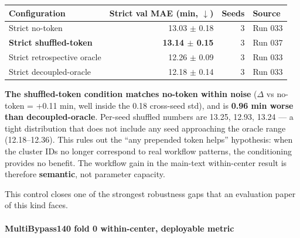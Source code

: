\begin{longtable}[]{@{}lrrl@{}}
\toprule\noalign{}
Configuration & Strict val MAE (min, $\downarrow$) & Seeds & Source \\
\midrule\noalign{}
\endhead
\bottomrule\noalign{}
\endlastfoot
Strict no-token & 13.03 $\pm$ 0.18 & 3 & Run 033 \\
\textbf{Strict shuffled-token} & \textbf{13.14 $\pm$ 0.15} & 3 & Run 037 \\
Strict retrospective oracle & 12.26 $\pm$ 0.09 & 3 & Run 033 \\
Strict decoupled-oracle & 12.18 $\pm$ 0.14 & 3 & Run 033 \\
\end{longtable}

\textbf{The shuffled-token condition matches no-token within noise} ($\Delta$
vs no-token = +0.11 min, well inside the 0.18 cross-seed std), and is
\textbf{0.96 min worse than decoupled-oracle}. Per-seed shuffled numbers
are 13.25, 12.93, 13.24 --- a tight distribution that does not include
any seed approaching the oracle range (12.18--12.36). This rules out the
``any prepended token helps'' hypothesis: when the cluster IDs no longer
correspond to real workflow patterns, the conditioning provides no
benefit. The workflow gain in the main-text within-center result is therefore \textbf{semantic}, not
parameter capacity.

This control closes one of the strongest robustness gaps that an
evaluation paper of this kind faces.

\paragraph{MultiBypass140 fold 0 within-center, deployable
metric}\label{multibypass140-fold-0-within-center-deployable-metric}

